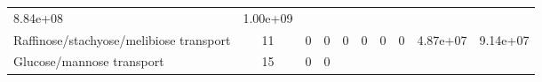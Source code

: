 \documentclass[]{article}
\begin{document}
\begin{longtable}[]{@{}lccccccccc@{}}
\begin{minipage}[t]{0.08\columnwidth}
8.84e+08\strut
\end{minipage} & \begin{minipage}[t]{0.08\columnwidth}\centering\strut
1.00e+09\strut
\end{minipage}\tabularnewline
\begin{minipage}[t]{0.07\columnwidth}\raggedright\strut
Raffinose/stachyose/melibiose transport\strut
\end{minipage} & \begin{minipage}[t]{0.06\columnwidth}\centering\strut
11\strut
\end{minipage} & \begin{minipage}[t]{0.08\columnwidth}\centering\strut
0\strut
\end{minipage} & \begin{minipage}[t]{0.08\columnwidth}\centering\strut
0\strut
\end{minipage} & \begin{minipage}[t]{0.08\columnwidth}\centering\strut
0\strut
\end{minipage} & \begin{minipage}[t]{0.08\columnwidth}\centering\strut
0\strut
\end{minipage} & \begin{minipage}[t]{0.08\columnwidth}\centering\strut
0\strut
\end{minipage} & \begin{minipage}[t]{0.08\columnwidth}\centering\strut
0\strut
\end{minipage} & \begin{minipage}[t]{0.08\columnwidth}\centering\strut
4.87e+07\strut
\end{minipage} & \begin{minipage}[t]{0.08\columnwidth}\centering\strut
9.14e+07\strut
\end{minipage}\tabularnewline
\begin{minipage}[t]{0.07\columnwidth}\raggedright\strut
Glucose/mannose transport\strut
\end{minipage} & \begin{minipage}[t]{0.06\columnwidth}\centering\strut
15\strut
\end{minipage} & \begin{minipage}[t]{0.08\columnwidth}\centering\strut
0\strut
\end{minipage} & \begin{minipage}[t]{0.08\columnwidth}\centering\strut
0\strut
\end{minipage} & \begin{minipage}[t]{0.08\columnwidth}\centering\strut

\end{minipage}
\end{longtable}
\end{document}
